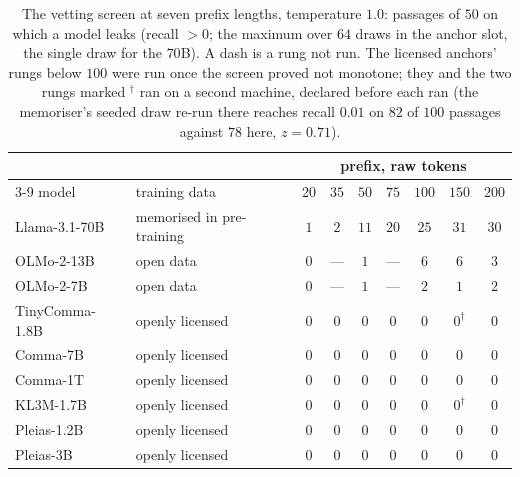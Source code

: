\begin{table}[ht]
\centering\footnotesize
\caption{The vetting screen at seven prefix lengths, temperature $1.0$: passages of $50$ on which a model leaks (recall
$> 0$; the maximum over $64$ draws in the anchor slot, the single draw for the $70$B). A dash is a rung not run. The licensed anchors' rungs below $100$ were run once the screen proved not monotone; they and the two rungs marked $^\dagger$ ran on a second machine, declared before each ran (the memoriser's seeded draw re-run there
reaches recall $0.01$ on $82$ of $100$ passages against $78$ here, $z = 0.71$).}
\label{tab:vetladder}
\setlength{\tabcolsep}{4pt}
\begin{tabular}{@{}llccccccc@{}}
\toprule
 & & \multicolumn{7}{c}{prefix, raw tokens} \\
\cmidrule(l){3-9}
model & training data & $20$ & $35$ & $50$ & $75$ & $100$ & $150$ & $200$ \\
\midrule
Llama-3.1-70B & memorised in pre-training & $1$ & $2$ & $11$ & $20$ & $25$ & $31$ & $30$ \\
OLMo-2-13B & open data & $0$ & --- & $1$ & --- & $6$ & $6$ & $3$ \\
OLMo-2-7B & open data & $0$ & --- & $1$ & --- & $2$ & $1$ & $2$ \\
\midrule
TinyComma-1.8B & openly licensed & $0$ & $0$ & $0$ & $0$ & $0$ & $0^\dagger$ & $0$ \\
Comma-7B & openly licensed & $0$ & $0$ & $0$ & $0$ & $0$ & $0$ & $0$ \\
Comma-1T & openly licensed & $0$ & $0$ & $0$ & $0$ & $0$ & $0$ & $0$ \\
KL3M-1.7B & openly licensed & $0$ & $0$ & $0$ & $0$ & $0$ & $0^\dagger$ & $0$ \\
Pleias-1.2B & openly licensed & $0$ & $0$ & $0$ & $0$ & $0$ & $0$ & $0$ \\
Pleias-3B & openly licensed & $0$ & $0$ & $0$ & $0$ & $0$ & $0$ & $0$ \\
\bottomrule
\end{tabular}
\end{table}


